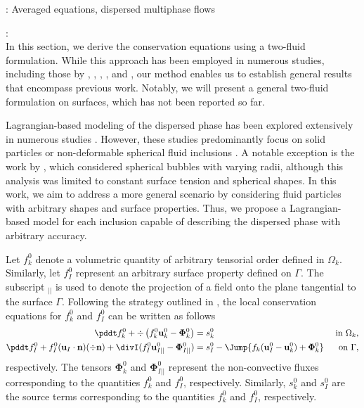 \documentclass[12pt,a4paper]{article}
\begin{document}
\vspace{10pt}
: Averaged equations, dispersed multiphase flows

\vspace{10pt}
:\\

In this section, we derive the conservation equations using a two-fluid formulation. While this approach has been employed in numerous studies, including those by \citet{kataoka1986local}, \citet{lhuillier2010multiphase}, \citet{ishii2010thermo}, \citet{morel2015mathematical}, and \citet{bothe2022sharp}, our method enables us to establish general results that encompass previous work. Notably, we will present a general two-fluid formulation on surfaces, which has not been reported so far.


Lagrangian-based modeling of the dispersed phase has been explored extensively in numerous studies \citep{buyevich1979flow, lhuillier1992volume, simonin1996, zhang1994averaged, zhang1994ensemble, zhang1997momentum, jackson1997locally, zaepffel2011modelisation}. However, these studies predominantly focus on solid particles \citep{buyevich1979flow, lhuillier1992volume, simonin1996, zhang1994averaged, jackson1997locally} or non-deformable spherical fluid inclusions \citep{zhang1994ensemble, zaepffel2011modelisation}. A notable exception is the work by \citep{zhang1994ensemble}, which considered spherical bubbles with varying radii, although this analysis was limited to constant surface tension and spherical shapes. In this work, we aim to address a more general scenario by considering fluid particles with arbitrary shapes and surface properties. Thus, we propose a Lagrangian-based model for each inclusion capable of describing the dispersed phase with arbitrary accuracy.

Let $f_k^0$ denote a volumetric quantity of arbitrary tensorial order defined in $\Omega_k$.
Similarly, let $f_I^0$ represent an arbitrary surface property defined on $\Gamma$. The subscript $_{||}$ is used to denote the projection of a field onto the plane tangential to the surface $\Gamma$. Following the strategy outlined in \citep{ishii2010thermo,bothe2022sharp}, the local conservation equations for $f_k^0$ and $f_I^0$ can be written as follows
\begin{align}
    \label{eq:dt_f_k}
    \pddt f_k^0
    +\div \left(
        f_k^0\textbf{u}_k^0
        - \mathbf{\Phi}_k^0
        \right)
    &= 
    s_k^0
    & \text{ in } \Omega_k,&\\
    \pddt f_I^0 
    + f_I^0 (\textbf{u}_I \cdot \textbf{n})(\div \textbf{n})
    +\divI
    (f_I^0 \textbf{u}_{I||}^0
        - \mathbf{\Phi}_{I||}^0 )
    &= 
    s_I^0
    - \Jump{
       f_k (\textbf{u}_I^0 - \textbf{u}_k^0)
       + \mathbf{\Phi}_k^0
    } 
    & \text{ on } \Gamma,&
    \label{eq:dt_f_I}
\end{align}
respectively. The tensors $\mathbf{\Phi}_k^0$ and $\mathbf{\Phi}_{I||}^0$ represent the non-convective fluxes corresponding to the quantities $f_k^0$ and $f_I^0$, respectively. Similarly, $s_k^0$ and $s_I^0$ are the source terms corresponding to the quantities $f_k^0$ and $f_I^0$, respectively.
\end{document}
